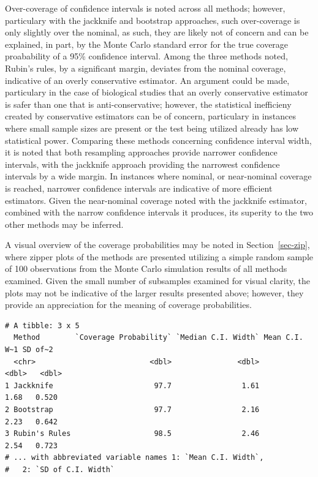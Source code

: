 \documentclass[
  letterpaper,
  DIV=11,
  numbers=noendperiod]{scrreprt}
\begin{document}
Over-coverage of confidence intervals is noted across all methods;
however, particulary with the jackknife and bootstrap approaches, such
over-coverage is only slightly over the nominal, as such, they are
likely not of concern and can be explained, in part, by the Monte Carlo
standard error for the true coverage proabability of a 95\% confidence
interval. Among the three methods noted, Rubin's rules, by a significant
margin, deviates from the nominal coverage, indicative of an overly
conservative estimator. An argument could be made, particulary in the
case of biological studies that an overly conservative estimator is
safer than one that is anti-conservative; however, the statistical
inefficieny created by conservative estimators can be of concern,
particulary in instances where small sample sizes are present or the
test being utilized already has low statistical power. Comparing these
methods concerning confidence interval width, it is noted that both
resampling approaches provide narrower confidence intervals, with the
jackknife approach providing the narrowest confidence intervals by a
wide margin. In instances where nominal, or near-nominal coverage is
reached, narrower confidence intervals are indicative of more efficient
estimators. Given the near-nominal coverage noted with the jackknife
estimator, combined with the narrow confidence intervals it produces,
its superity to the two other methods may be inferred.

A visual overview of the coverage probabilities may be noted in
Section~\ref{sec-zip}, where zipper plots of the methods are presented
utilizing a simple random sample of 100 observations from the Monte
Carlo simulation results of all methods examined. Given the small number
of subsamples examined for visual clarity, the plots may not be
indicative of the larger results presented above; however, they provide
an appreciation for the meaning of coverage probabilities.

\begin{verbatim}
# A tibble: 3 x 5
  Method        `Coverage Probability` `Median C.I. Width` Mean C.I. W~1 SD of~2
  <chr>                          <dbl>               <dbl>         <dbl>   <dbl>
1 Jackknife                       97.7                1.61          1.68   0.520
2 Bootstrap                       97.7                2.16          2.23   0.642
3 Rubin's Rules                   98.5                2.46          2.54   0.723
# ... with abbreviated variable names 1: `Mean C.I. Width`,
#   2: `SD of C.I. Width`
\end{verbatim}
\end{document}
